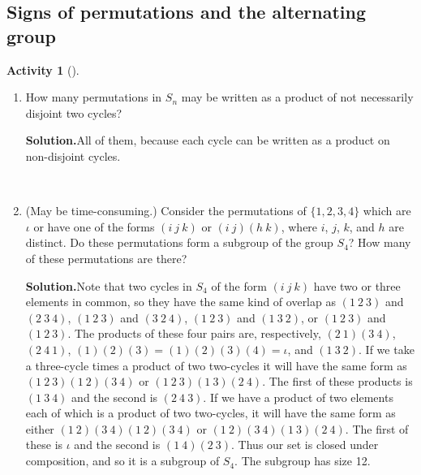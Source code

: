 \documentclass[10pt,]{book}
\theoremstyle{plain}
\theoremstyle{definition}
\newtheorem{activity}[project]{Activity}
\numberwithin{equation}{chapter}
\begin{document}
\subsection[{Signs of permutations and the alternating group}]{Signs of permutations and the alternating group}\label{subsection-64}
\begin{activity}[]\label{activity-273}
~\par
\begin{enumerate}[label=(\alph*)]
 \item How many permutations in \(S_n\) may be written as a product of not necessarily disjoint two cycles?%
\par\medskip\noindent%
\textbf{Solution.}\quad All of them, because each cycle can be written as a product on non-disjoint cycles.%

~\par
\item (May be time-consuming.) Consider the permutations of \(\{1,2,3,4\}\) which are \(\iota\) or have one of the forms \((i\ j\ k)\) or \((i\ j)(h\ k)\), where \(i\), \(j\), \(k\), and \(h\) are distinct.  Do these permutations form a subgroup of the group \(S_4\)?  How many of these permutations are there?%
\par\medskip\noindent%
\textbf{Solution.}\quad Note that two cycles in \(S_4\) of the form \((i\ j\ k)\) have two or three elements in common, so they have the same kind of overlap as \((1\ 2\ 3)\) and \((2\ 3\
4)\), \((1\ 2\ 3)\) and \((3\ 2\ 4)\), \((1\ 2\ 3)\) and \((1\ 3\ 2)\), or \((1\ 2\ 3)\) and \((1\
2\ 3)\). The products of these four pairs are, respectively, \((2\ 1)(3\ 4)\), \((2\ 4\
1)\), \((1)(2)(3)= (1)(2)(3)(4)=\iota\), and \((1\ 3\ 2)\). If we take a three-cycle times a product of two two-cycles it will have the same form as \((1\ 2\ 3)(1\ 2)(3\ 4)\) or \((1\ 2\ 3)(1\ 3)(2\ 4)\). The first of these products is \((1\ 3\ 4)\) and the second is \((2\ 4\ 3)\). If we have a product of two elements each of which is a product of two two-cycles, it will have the same form as either \((1\ 2)(3\ 4)(1\ 2)(3\ 4)\) or \((1\ 2)(3\ 4)(1\ 3)(2\ 4)\). The first of these is \(\iota\) and the second is \((1\
4)(2\ 3)\). Thus our set is closed under composition, and so it is a subgroup of \(S_4\). The subgroup has size 12.%

\end{enumerate}
\end{activity}
\end{document}
